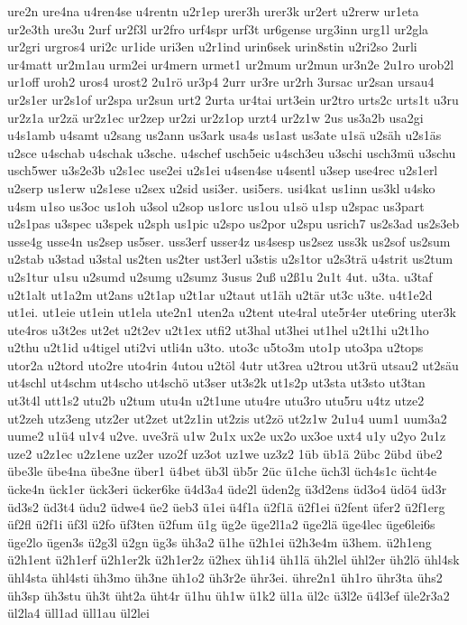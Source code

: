 {ure2n
ure4na
u4ren4se
u4rentn
u2r1ep
urer3h
urer3k
ur2ert
u2rerw
ur1eta
ur2e3th
ure3u
2urf
ur2f3l
ur2fro
urf4spr
urf3t
ur6gense
urg3inn
urg1l
ur2gla
ur2gri
urgros4
uri2c
ur1ide
uri3en
u2r1ind
urin6sek
urin8stin
u2ri2so
2urli
ur4matt
ur2m1au
urm2ei
ur4mern
urmet1
ur2mum
ur2mun
ur3n2e
2u1ro
urob2l
ur1off
uroh2
uros4
urost2
2u1rö
ur3p4
2urr
ur3re
ur2rh
3ursac
ur2san
ursau4
ur2s1er
ur2s1of
ur2spa
ur2sun
urt2
2urta
ur4tai
urt3ein
ur2tro
urts2c
urts1t
u3ru
ur2z1a
ur2zä
ur2z1ec
ur2zep
ur2zi
ur2z1op
urzt4
ur2z1w
2us
us3a2b
usa2gi
u4s1amb
u4samt
u2sang
us2ann
us3ark
usa4s
us1ast
us3ate
u1sä
u2säh
u2s1äs
u2sce
u4schab
u4schak
u3sche.
u4schef
usch5eic
u4sch3eu
u3schi
usch3mü
u3schu
usch5wer
u3s2e3b
u2s1ec
use2ei
u2s1ei
u4sen4se
u4sentl
u3sep
use4rec
u2s1erl
u2serp
us1erw
u2s1ese
u2sex
u2sid
usi3er.
usi5ers.
usi4kat
us1inn
us3kl
u4sko
u4sm
u1so
us3oc
us1oh
u3sol
u2sop
us1orc
us1ou
u1sö
u1sp
u2spac
us3part
u2s1pas
u3spec
u3spek
u2sph
us1pic
u2spo
us2por
u2spu
usrich7
us2s3ad
us2s3eb
usse4g
usse4n
us2sep
us5ser.
uss3erf
usser4z
us4sesp
us2sez
uss3k
us2sof
us2sum
u2stab
u3stad
u3stal
us2ten
us2ter
ust3erl
u3stis
u2s1tor
u2s3trä
u4strit
us2tum
u2s1tur
u1su
u2sumd
u2sumg
u2sumz
3usus
2uß
u2ß1u
2u1t
4ut.
u3ta.
u3taf
u2t1alt
ut1a2m
ut2ans
u2t1ap
u2t1ar
u2taut
ut1äh
u2tär
ut3c
u3te.
u4t1e2d
ut1ei.
ut1eie
ut1ein
ut1ela
ute2n1
uten2a
u2tent
ute4ral
ute5r4er
ute6ring
uter3k
ute4ros
u3t2es
ut2et
u2t2ev
u2t1ex
utfi2
ut3hal
ut3hei
ut1hel
u2t1hi
u2t1ho
u2thu
u2t1id
u4tigel
uti2vi
utli4n
u3to.
uto3c
u5to3m
uto1p
uto3pa
u2tops
utor2a
u2tord
uto2re
uto4rin
4utou
u2töl
4utr
ut3rea
u2trou
ut3rü
utsau2
ut2säu
ut4schl
ut4schm
ut4scho
ut4schö
ut3ser
ut3s2k
ut1s2p
ut3sta
ut3sto
ut3tan
ut3t4l
utt1s2
utu2b
u2tum
utu4n
u2t1une
utu4re
utu3ro
utu5ru
u4tz
utze2
ut2zeh
utz3eng
utz2er
ut2zet
ut2z1in
ut2zis
ut2zö
ut2z1w
2u1u4
uum1
uum3a2
uume2
u1ü4
u1v4
u2ve.
uve3rä
u1w
2u1x
ux2e
ux2o
ux3oe
uxt4
u1y
u2yo
2u1z
uze2
u2z1ec
u2z1ene
uz2er
uzo2f
uz3ot
uz1we
uz3z2
1üb
üb1ä
2übc
2übd
übe2
übe3le
übe4na
übe3ne
über1
ü4bet
üb3l
üb5r
2üc
ü1che
üch3l
üch4s1c
ücht4e
ücke4n
ück1er
ück3eri
ücker6ke
ü4d3a4
üde2l
üden2g
ü3d2ens
üd3o4
üdö4
üd3r
üd3s2
üd3t4
üdu2
üdwe4
üe2
üeb3
ü1ei
ü4f1a
ü2f1ä
ü2f1ei
ü2fent
üfer2
ü2f1erg
üf2fl
ü2f1i
üf3l
ü2fo
üf3ten
ü2fum
ü1g
üg2e
üge2l1a2
üge2lä
üge4lec
üge6lei6s
üge2lo
ügen3s
ü2g3l
ü2gn
üg3s
üh3a2
ü1he
ü2h1ei
ü2h3e4m
ü3hem.
ü2h1eng
ü2h1ent
ü2h1erf
ü2h1er2k
ü2h1er2z
ü2hex
üh1i4
üh1lä
üh2lel
ühl2er
üh2lö
ühl4sk
ühl4sta
ühl4sti
üh3mo
üh3ne
üh1o2
üh3r2e
ühr3ei.
ühre2n1
üh1ro
ühr3ta
ühs2
üh3sp
üh3stu
üh3t
üht2a
üht4r
ü1hu
üh1w
ü1k2
ül1a
ül2c
ü3l2e
ü4l3ef
üle2r3a2
ül2la4
üll1ad
üll1au
ül2lei
}
